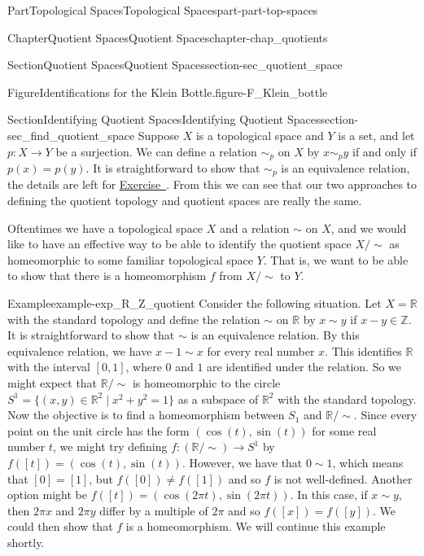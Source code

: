 \documentclass[oneside,10pt,]{book}
\newcommand{\xreffont}{\relax}
\numberwithin{equation}{chapter}
\newcommand{\Z}{\mathbb{Z}}
\newcommand{\R}{\mathbb{R}}
\newcommand{\ssim}{\sim}
\begin{document}
\begin{partptx}{Part}{Topological Spaces}{}{Topological Spaces}{}{}{part-part-top-spaces}
\begin{chapterptx}{Chapter}{Quotient Spaces}{}{Quotient Spaces}{}{}{chapter-chap_quotients}
\begin{sectionptx}{Section}{Quotient Spaces}{}{Quotient Spaces}{}{}{section-sec_quotient_space}
\begin{figureptx}{Figure}{Identifications for the Klein Bottle.}{figure-F_Klein_bottle}{}
\tcblower
\end{figureptx}%
\end{sectionptx}
%
%
\typeout{************************************************}
\typeout{************************************************}
%
\begin{sectionptx}{Section}{Identifying Quotient Spaces}{}{Identifying Quotient Spaces}{}{}{section-sec_find_quotient_space}
Suppose \(X\) is a topological space and \(Y\) is a set, and let \(p: X \to Y\) be a surjection. We can define a relation \(\sim_p\) on \(X\) by \(x \sim_p y\) if and only if \(p(x) = p(y)\). It is straightforward to show that \(\sim_p\) is an equivalence relation, the details are left for \hyperlink{exercise-ex_sim_p_relation}{Exercise~{\xreffont 1}}. From this we can see that our two approaches to defining the quotient topology and quotient spaces are really the same.%
\par
Oftentimes we have a topological space \(X\) and a relation \(\sim\) on \(X\), and we would like to have an effective way to be able to identify the quotient space \(X/\ssim\) as homeomorphic to some familiar topological space \(Y\). That is, we want to be able to show that there is a homeomorphism \(f\) from \(X/\ssim\) to \(Y\).%
\begin{example}{Example}{}{example-exp_R_Z_quotient}%
Consider the following situation. Let \(X = \R\) with the standard topology and define the relation \(\sim\) on \(\R\) by \(x \sim y\) if \(x - y \in \Z\). It is straightforward to show that \(\sim\) is an equivalence relation. By this equivalence relation, we have \(x-1 \sim x\) for every real number \(x\). This identifies \(\R\) with the interval \([0,1]\), where \(0\) and \(1\) are identified under the relation. So we might expect that \(\R/\ssim\) is homeomorphic to the circle \(S^1 = \{(x,y) \in \R^2 \mid x^2+y^2 = 1\}\) as a subspace of \(\R^2\) with the standard topology. Now the objective is to find a homeomorphism between \(S_1\) and \(\R/\ssim\). Since every point on the unit circle has the form \((\cos(t), \sin(t))\) for some real number \(t\), we might try defining \(f: (\R/\ssim) \to S^1\) by \(f([t]) = (\cos(t), \sin(t))\). However, we have that \(0 \sim 1\), which means that \([0] = [1]\), but \(f([0]) \neq f([1])\) and so \(f\) is not well-defined. Another option might be \(f([t]) = (\cos(2 \pi t), \sin(2 \pi t))\). In this case, if \(x \sim y\), then \(2 \pi x\) and \(2 \pi y\) differ by a multiple of \(2 \pi\) and so \(f([x]) = f([y])\). We could then show that \(f\) is a homeomorphism. We will continue this example shortly.%

\end{example}
\end{sectionptx}
\end{chapterptx}
\end{partptx}
\end{document}
